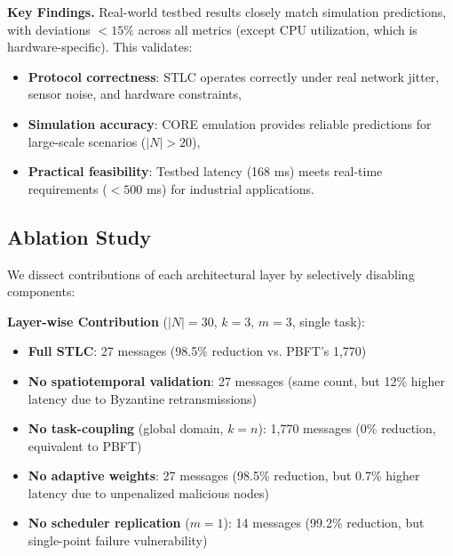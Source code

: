 \documentclass[lettersize,journal]{IEEEtran}
\begin{document}
\begin{table}[h]
\centering
\caption{Testbed vs. Simulation: Summary of Key Metrics}
\label{tab:testbed_summary}
\small
{}
\end{table}

\textbf{Key Findings.} Real-world testbed results closely match simulation 
predictions, with deviations $< 15\%$ across all metrics (except CPU 
utilization, which is hardware-specific). This validates:
\begin{itemize}
    \item \textbf{Protocol correctness}: STLC operates correctly under 
          real network jitter, sensor noise, and hardware constraints,
    \item \textbf{Simulation accuracy}: CORE emulation provides reliable 
          predictions for large-scale scenarios ($|N| > 20$),
    \item \textbf{Practical feasibility}: Testbed latency (168 ms) meets 
          real-time requirements ($< 500$ ms) for industrial applications.
\end{itemize}

\subsection{Ablation Study}

We dissect contributions of each architectural layer by selectively 
disabling components:

\textbf{Layer-wise Contribution} ($|N|=30$, $k=3$, $m=3$, single task):
\begin{itemize}
    \item \textbf{Full STLC}: 27 messages (98.5\% reduction vs. PBFT's 
          1,770)
    \item \textbf{No spatiotemporal validation}: 27 messages (same count, 
          but 12\% higher latency due to Byzantine retransmissions)
    \item \textbf{No task-coupling} (global domain, $k=n$): 1,770 messages 
          (0\% reduction, equivalent to PBFT)
    \item \textbf{No adaptive weights}: 27 messages (98.5\% reduction, but 
          0.7\% higher latency due to unpenalized malicious nodes)
    \item \textbf{No scheduler replication} ($m=1$): 14 messages (99.2\% 
          reduction, but single-point failure vulnerability)
\end{itemize}
\end{document}
